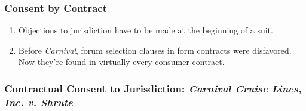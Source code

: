 \subsubsection{Consent by Contract}

\begin{enumerate}
    \item Objections to jurisdiction have to be made at the beginning of a 
    suit.
    \item Before \emph{Carnival}, forum selection clauses in form contracts 
    were disfavored. Now they're found in virtually every consumer contract.
\end{enumerate}

\subsubsection{Contractual Consent to Jurisdiction: \emph{Carnival Cruise 
Lines, Inc. v. Shrute}}

